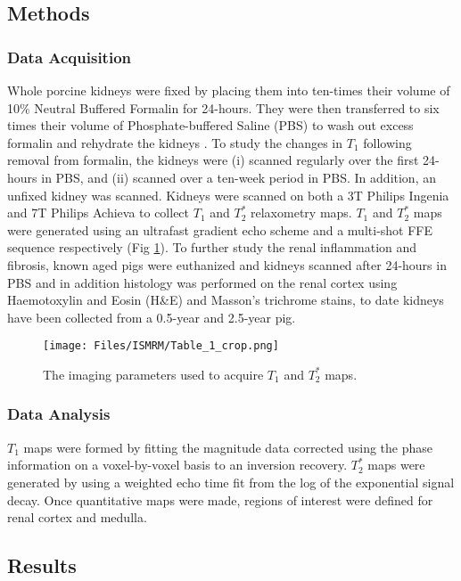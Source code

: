 \subsection*{Methods}
\subsubsection*{Data Acquisition}

Whole porcine kidneys were fixed by placing them into ten-times their volume of 10\% Neutral Buffered Formalin for 24-hours. They were then transferred to six times their volume of Phosphate-buffered Saline (PBS) to wash out excess formalin and rehydrate the kidneys \cite{sengupta_high_2017}. To study the changes in $T_1$ following removal from formalin, the kidneys were (i) scanned regularly over the first 24-hours in PBS, and (ii) scanned over a ten-week period in PBS. In addition, an unfixed kidney was scanned. Kidneys were scanned on both a 3T Philips Ingenia and 7T Philips Achieva to collect $T_1$ and $T_2^*$ relaxometry maps. $T_1$ and $T_2^*$ maps were generated using an ultrafast gradient echo scheme and a multi-shot FFE sequence respectively (Fig \ref{fig:ISMRM_Fig_1}). To further study the renal inflammation and fibrosis, known aged pigs were euthanized and kidneys scanned after 24-hours in PBS and in addition histology was performed on the renal cortex using Haemotoxylin and Eosin (H\&E) and Masson’s trichrome stains, to date kidneys have been collected from a 0.5-year and 2.5-year pig.

\begin{figure}[H]
	\centering
	\texttt{[image: Files/ISMRM/Table\_1\_crop.png]}
	\caption{The imaging parameters used to acquire $T_1$ and $T_2^*$ maps.}
	\label{fig:ISMRM_Fig_1}
\end{figure}

\subsubsection*{Data Analysis}

$T_1$ maps were formed by fitting the magnitude data corrected using the phase information \cite{szumowski_signal_2012} on a voxel-by-voxel basis to an inversion recovery. $T_2^*$ maps were generated by using a weighted echo time fit from the log of the exponential signal decay. Once quantitative maps were made, regions of interest were defined for renal cortex and medulla.

\subsection*{Results}

